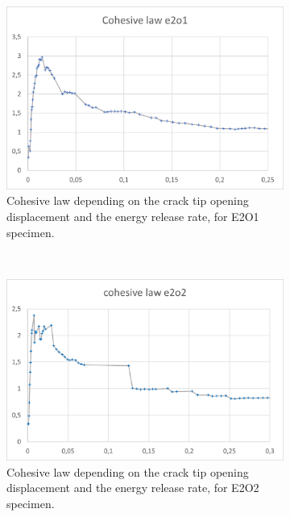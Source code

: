 \begin{figure}[H]
\centering
\begin{subfigure}{0.48\linewidth}
	\centering
	\includegraphics[scale=0.6]{Figures/e2o1_colaw}
	\decoRule
	\caption[Cohesive law from E2O1 specimen]{Cohesive law depending on the crack tip opening displacement and the energy release rate, for E2O1 specimen.}
	\label{fig:E2O1_colaw}
\end{subfigure}
\hfill\\
\begin{subfigure}{0.48\linewidth}
	\centering
	\includegraphics[scale=0.6]{Figures/e2o2_colaw}
	\decoRule
	\caption[Cohesive law from E2O2 specimen]{Cohesive law depending on the crack tip opening displacement and the energy release rate, for E2O2 specimen.}
	\label{fig:E2O2_colaw}
\end{subfigure}
\hfill\\
\begin{subfigure}{0.48\linewidth}

\end{subfigure}
\end{figure}
